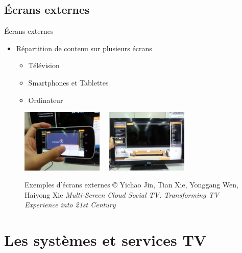 \documentclass{beamer}
\begin{document}
	\subsection{Écrans externes}
	\begin{frame}{Écrans externes}
\begin{itemize}
	\item Répartition de contenu sur plusieurs écrans
		\begin{itemize}
			\item Télévision
			\item Smartphones et Tablettes
			\item Ordinateur
		\end{itemize}
\end{itemize}
\begin{figure}[H]
	\centering
	\includegraphics[height=3cm]{images/externalsScreens/1.png}~~
	\includegraphics[height=3cm]{images/externalsScreens/2.png}

	\caption{Exemples d'écrans externes\newline
	\tiny
	© Yichao Jin, Tian Xie, Yonggang Wen, Haiyong Xie\newline
	\textit{ Multi-Screen Cloud Social TV: Transforming TV Experience into 21st Century }
	}
\end{figure}
	\end{frame}
	\section{Les systèmes et services TV}
\end{document}
